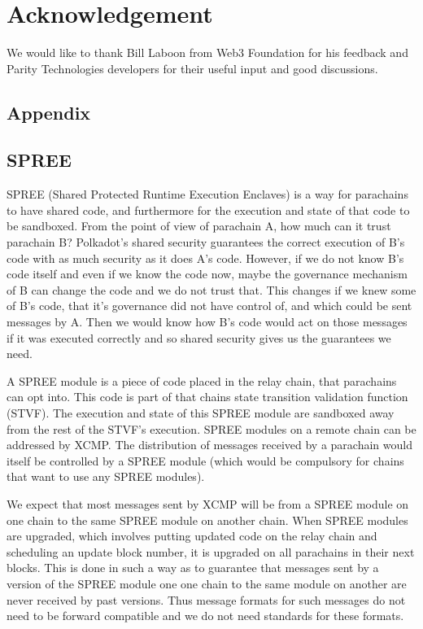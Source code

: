 \documentclass{article}
\begin{document}
\section*{Acknowledgement}
We would like to thank Bill Laboon from Web3 Foundation for his feedback and Parity Technologies developers for their useful input and good discussions.


\begin{appendix}
\section{Appendix}

\subsection{SPREE} \label{sec:SPREE}

SPREE (Shared Protected Runtime Execution Enclaves) is a way for parachains to have shared code, and furthermore for the execution and state of that code to be sandboxed. From the point of view of parachain A, how much can it trust parachain B? Polkadot's shared security guarantees the correct execution of B's code with as much security as it does A's code. However, if we do not know B's code itself and even if we know the code now, maybe the governance mechanism of B can change the code and we do not trust that. This changes if we knew some of B's code, that it's governance did not have control of, and which could be sent messages by A. Then we would know how B's code would act on those messages if it was executed correctly and so shared security gives us the guarantees we need.

A SPREE module is a piece of code placed in the relay chain, that parachains can opt into. This code is part of that chains state transition validation function (STVF). The execution and state of this SPREE module are sandboxed away from the rest of the STVF's execution. SPREE modules on a remote chain can be addressed by XCMP. The distribution of messages received by a parachain would itself be controlled by a SPREE module (which would be compulsory for chains that want to use any SPREE modules).

We expect that most messages sent by XCMP will be from a SPREE module on one chain to the same SPREE module on another chain. When SPREE modules are upgraded, which involves putting updated code on the relay chain and scheduling an update block number, it is upgraded on all parachains in their next blocks. This is done in such a way as to guarantee that messages sent by a version of the SPREE module one one chain to the same module on another are never received by past versions. Thus message formats for such messages do not need to be forward compatible and we do not need standards for these formats.


\end{appendix}
\end{document}
